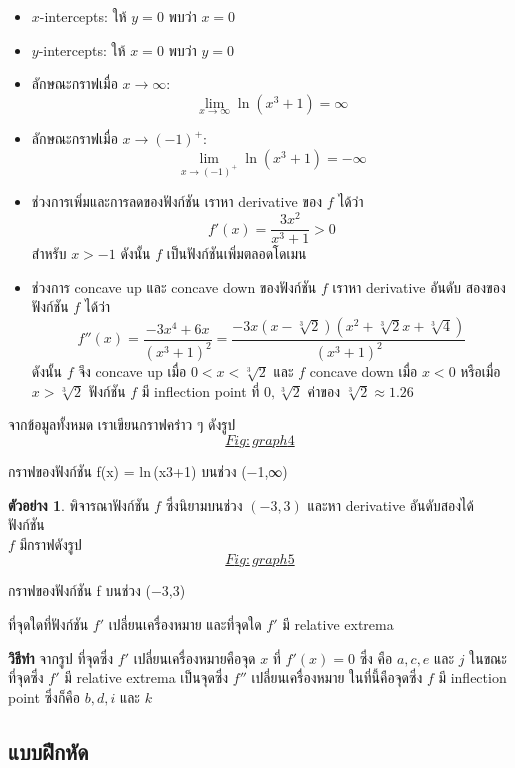 \documentclass[
]{book}
\theoremstyle{definition}
\theoremstyle{definition}
\newtheorem{example}{ตัวอย่าง}[chapter]
\theoremstyle{definition}
\theoremstyle{definition}
\theoremstyle{remark}
\begin{document}
\begin{itemize}
\item
  \(x\)-intercepts: ให้ \(y=0\) พบว่า \(x=0\)
\item
  \(y\)-intercepts: ให้ \(x=0\) พบว่า \(y=0\)
\item
  ลักษณะกราฟเมื่อ \(x \to \infty\):
  \[\lim_{x\to\infty} \ln(x^3+1) = \infty\]
\item
  ลักษณะกราฟเมื่อ \(x\to (-1)^+\):
  \[\lim_{x\to (-1)^+} \ln(x^3+1) = -\infty\]
\item
  ช่วงการเพิ่มและการลดของฟังก์ชัน เราหา derivative ของ \(f\) ได้ว่า
  \[f'(x) = \frac{3x^2}{x^3+1} > 0\] สำหรับ \(x>-1\) ดังนั้น \(f\)
  เป็นฟังก์ชันเพิ่มตลอดโดเมน
\item
  ช่วงการ concave up และ concave down ของฟังก์ชัน \(f\) เราหา derivative
  อันดับ สองของฟังก์ชัน \(f\) ได้ว่า
  \[f''(x) = \frac{-3x^4+6x}{(x^3+1)^2} = \frac{-3x(x-\sqrt[3]{2})(x^2+\sqrt[3]{2}x+\sqrt[3]{4})}{(x^3+1)^2}\]
  ดังนั้น \(f\) จึง concave up เมื่อ \(0<x<\sqrt[3]{2}\) และ \(f\) concave down
  เมื่อ \(x<0\) หรือเมื่อ \(x>\sqrt[3]{2}\) ฟังก์ชัน \(f\) มี inflection point ที่
  \(0,\sqrt[3]{2}\) ค่าของ \(\sqrt[3]{2} \approx 1.26\)
\end{itemize}

จากข้อมูลทั้งหมด เราเขียนกราฟคร่าว ๆ
ดังรูป~\hyperref[Fig:graph4]{\[Fig:graph4\]}

กราฟของฟังก์ชัน
{f(x) = ln (x3+1)}
บนช่วง {(−1,∞)}

\begin{example}
พิจารณาฟังก์ชัน \(f\) ซึ่งนิยามบนช่วง \((-3,3)\) และหา derivative อันดับสองได้ ฟังก์ชัน\\
\(f\) มีกราฟดังรูป~\hyperref[Fig:graph5]{\[Fig:graph5\]}

กราฟของฟังก์ชัน {f} บนช่วง
{(−3,3)}

ที่จุดใดที่ฟังก์ชัน \(f'\) เปลี่ยนเครื่องหมาย และที่จุดใด \(f'\) มี relative extrema
\end{example}

\textbf{วิธีทำ} จากรูป ที่จุดซึ่ง \(f'\) เปลี่ยนเครื่องหมายคือจุด \(x\) ที่ \(f'(x) = 0\) ซึ่ง คือ
\(a, c, e\) และ \(j\) ในขณะที่จุดซึ่ง \(f'\) มี relative extrema เป็นจุดซึ่ง \(f''\)
เปลี่ยนเครื่องหมาย ในที่นี้คือจุดซึ่ง \(f\) มี inflection point ซึ่งก็คือ \(b, d, i\) และ \(k\)

\subsection{แบบฝึกหัด}\label{uxe41uxe1auxe1auxe1duxe01uxe2buxe14-4}
\end{document}
